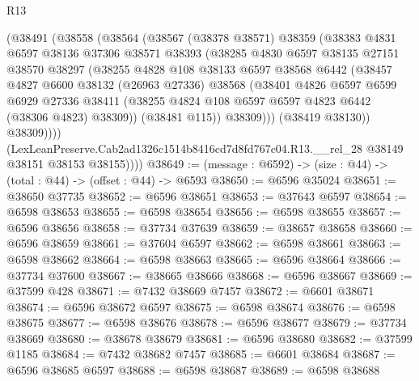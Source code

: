 \begin{lexlean}{R13}
\begin{coremodule}
            (@38491
              (@38558
                (@38564
                  (@38567
                    (@38378 @38571)
                    @38359
                    (@38383
                      @4831
                      @6597
                      @38136
                      @37306
                      @38571
                      @38393
                      (@38285
                        @4830
                        @6597
                        @38135
                        @27151
                        @38570
                        @38297
                        (@38255
                          @4828
                          @108
                          @38133
                          @6597
                          @38568
                          @6442
                          (@38457
                            @4827
                            @6600
                            @38132
                            (@26963 @27336)
                            @38568
                            (@38401
                              @4826
                              @6597
                              @6599
                              @6929
                              @27336
                              @38411
                              (@38255 @4824 @108 @6597 @6597 @4823 @6442 (@38306 @4823) @38309))
                            (@38481 @115))
                          @38309)))
                    (@38419 @38130))
                  @38309))))
          (LexLeanPreserve.Cab2ad1326c1514b8416cd7d8fd767c04.R13.__rel_28
            @38149
            @38151
            @38153
            @38155))))
@38649 := (message : @6592) -> (size : @44) -> (total : @44) -> (offset : @44) -> @6593
@38650 := @6596 @35024
@38651 := @38650 @37735
@38652 := @6596 @38651
@38653 := @37643 @6597
@38654 := @6598 @38653
@38655 := @6598 @38654
@38656 := @6598 @38655
@38657 := @6596 @38656
@38658 := @37734 @37639
@38659 := @38657 @38658
@38660 := @6596 @38659
@38661 := @37604 @6597
@38662 := @6598 @38661
@38663 := @6598 @38662
@38664 := @6598 @38663
@38665 := @6596 @38664
@38666 := @37734 @37600
@38667 := @38665 @38666
@38668 := @6596 @38667
@38669 := @37599 @428
@38671 := @7432 @38669 @7457
@38672 := @6601 @38671
@38674 := @6596 @38672 @6597
@38675 := @6598 @38674
@38676 := @6598 @38675
@38677 := @6598 @38676
@38678 := @6596 @38677
@38679 := @37734 @38669
@38680 := @38678 @38679
@38681 := @6596 @38680
@38682 := @37599 @1185
@38684 := @7432 @38682 @7457
@38685 := @6601 @38684
@38687 := @6596 @38685 @6597
@38688 := @6598 @38687
@38689 := @6598 @38688

\end{coremodule}
\end{lexlean}
